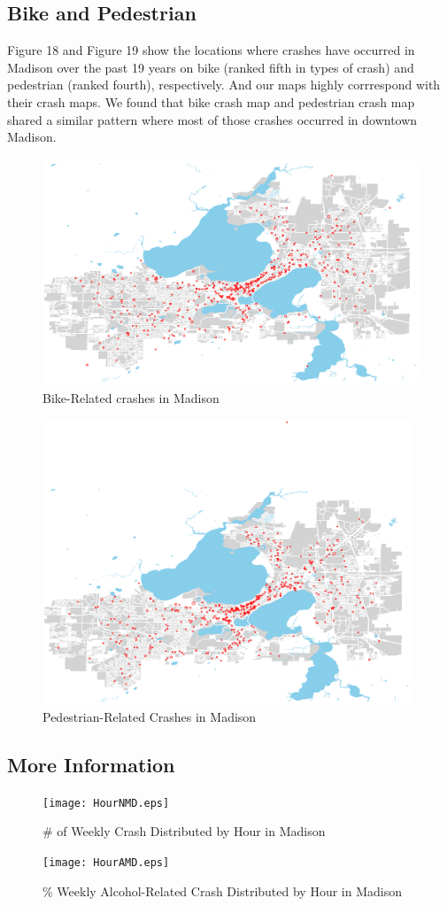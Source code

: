 \documentclass[15pt]{article}
\begin{document}
\subsection{Bike and Pedestrian}
Figure 18 and Figure 19 show the locations where crashes have occurred in Madison over the past 19 years on bike (ranked fifth in types of crash) and pedestrian (ranked fourth), respectively. And our maps highly corrrespond with their crash maps. We found that bike crash map and pedestrian crash map shared a similar pattern where most of those crashes occurred in downtown Madison.
\begin{figure}[H]
\raggedleft
\includegraphics[height=68mm]{bike.eps}
\caption{Bike-Related crashes in Madison}
\end{figure}

\begin{figure}[H]
\raggedleft
\includegraphics[height=85mm]{ped.eps}
\caption{Pedestrian-Related Crashes in Madison}
\end{figure}

\newpage
\subsection{More Information}
\begin{figure}[H]
\center
\texttt{[image: HourNMD.eps]}
\caption{\# of Weekly Crash Distributed by Hour in Madison}
\label{sec:WH1}
\end{figure}

\begin{figure}[H]
\center
\texttt{[image: HourAMD.eps]}
\caption{\% Weekly Alcohol-Related Crash Distributed by Hour in Madison}
\end{figure}
\end{document}
